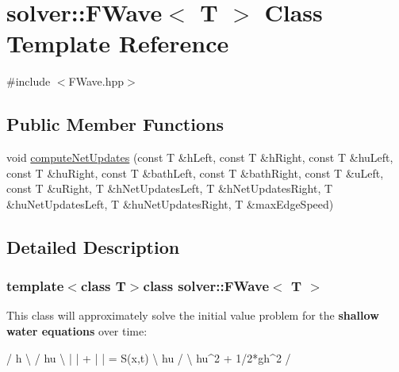 \hypertarget{classsolver_1_1FWave}{\section{solver\-:\-:F\-Wave$<$ T $>$ Class Template Reference}
\label{classsolver_1_1FWave}
}


{\ttfamily \#include $<$F\-Wave.\-hpp$>$}

\subsection*{Public Member Functions}
\begin{DoxyCompactItemize}
\item 
void \hyperlink{classsolver_1_1FWave_afb2981b71645544fe7d5a6f67553cf37}{compute\-Net\-Updates} (const T \&h\-Left, const T \&h\-Right, const T \&hu\-Left, const T \&hu\-Right, const T \&bath\-Left, const T \&bath\-Right, const T \&u\-Left, const T \&u\-Right, T \&h\-Net\-Updates\-Left, T \&h\-Net\-Updates\-Right, T \&hu\-Net\-Updates\-Left, T \&hu\-Net\-Updates\-Right, T \&max\-Edge\-Speed)
\end{DoxyCompactItemize}


\subsection{Detailed Description}
\subsubsection*{template$<$class T$>$class solver\-::\-F\-Wave$<$ T $>$}

This class will approximately solve the initial value problem for the {\bfseries shallow water equations} over time\-: 
\begin{DoxyPre}
/ h  \textbackslash{}   /    hu           \textbackslash{}
|    | + |                 |  = S(x,t)
\textbackslash{} hu /   \textbackslash{} hu^2 + 1/2*gh^2 /
\end{DoxyPre}
 

